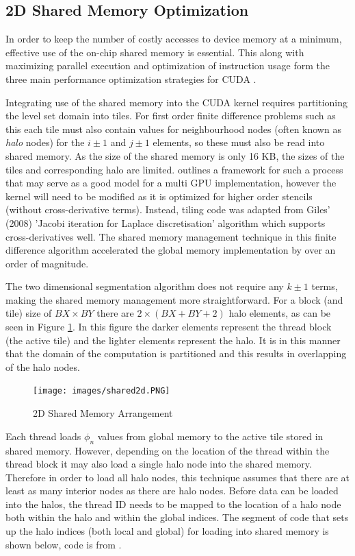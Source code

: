 	\subsection{2D Shared Memory Optimization}
In order to keep the number of costly accesses to device memory at a minimum, effective use of the on-chip shared memory is essential. This along with maximizing parallel execution and optimization of instruction usage form the three main performance optimization strategies for CUDA \cite{cuda}.

Integrating use of the shared memory into the CUDA kernel requires partitioning the level set domain into tiles. For first order finite difference problems such as this each tile must also contain values for neighbourhood nodes (often known as \textit{halo} nodes) for the $i\pm1$ and $j\pm1$ elements, so these must also be read into shared memory. As the size of the shared memory is only 16 KB, the sizes of the tiles and corresponding halo are limited. \cite{3dfinitedifference} outlines a framework for such a process that may serve as a good model for a multi GPU implementation, however the kernel will need to be modified as it is optimized for higher order stencils (without cross-derivative terms). Instead, tiling code was adapted from Giles' (2008) 'Jacobi iteration for Laplace discretisation' algorithm \cite{mgiles} which supports cross-derivatives well. The shared memory management technique in this finite difference algorithm accelerated the global memory implementation by over an order of magnitude.

The two dimensional segmentation algorithm does not require any $k\pm1$ terms, making the shared memory management more straightforward. For a block (and tile) size of $BX\times BY$ there are $2 \times (BX + BY +2)$ halo elements, as can be seen in Figure \ref{fig:shared2d}. In this figure the darker elements represent the thread block (the active tile) and the lighter elements represent the halo. It is in this manner that the domain of the computation is partitioned and this results in overlapping of the halo nodes.\\

\begin{figure}[h]
	\centering
		\texttt{[image: images/shared2d.PNG]}
	\caption{2D Shared Memory Arrangement}
	\label{fig:shared2d}
\end{figure}


Each thread loads  $\phi_n$ values from global memory to the active tile stored in shared memory. However, depending on the location of the thread within the thread block it may also load a single halo node into the shared memory. Therefore in order to load all halo nodes, this technique assumes that there are at least as many interior nodes as there are halo nodes. Before data can be loaded into the halos, the thread ID needs to be mapped to the location of a halo node both within the halo and within the global indices. The segment of code that sets up the halo indices (both local and global) for loading into shared memory is shown below, code is from \cite{mgiles}.


